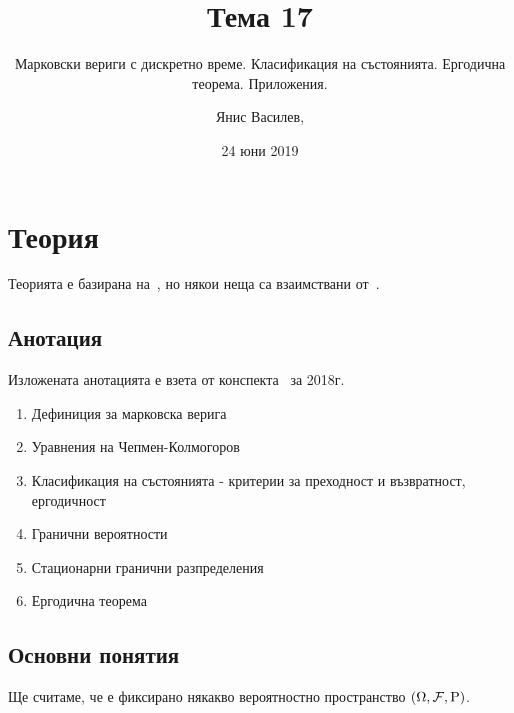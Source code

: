 \documentclass[numbers=endperiod, DIV=15, bibliography=totocnumbered]{scrartcl}
\title{Тема 17}
\subtitle{Марковски вериги с дискретно време. Класификация на състоянията. Ергодична теорема. Приложения.}
\author{Янис Василев, \Email{ianis@ivasilev.net}}
\date{24 юни 2019}
\begin{document}
\maketitle

\section{Теория}

Теорията е базирана на~\cite{Lectures}, но някои неща са взаимствани от~\cite{Borovkov}.

\subsection{Анотация}

Изложената анотацията е взета от конспекта~\cite{Syllabus} за 2018г.

\begin{enumerate}
  \item Дефиниция за марковска верига
  \item Уравнения на Чепмен-Колмогоров
  \item Класификация на състоянията - критерии за преходност и възвратност, ергодичност
  \item Гранични вероятности
  \item Стационарни гранични разпределения
  \item Ергодична теорема
\end{enumerate}

\subsection{Основни понятия}

Ще считаме, че е фиксирано някакво вероятностно пространство $(\Omega, \mathcal{F}, \operatorname{P})$.
\end{document}

